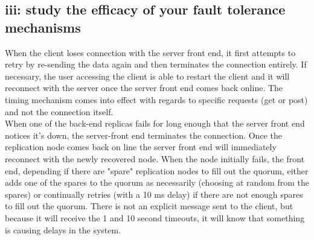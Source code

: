 \documentclass[12pt,letter]{article}
\begin{document}
\subsection*{iii: study the efficacy of your fault tolerance mechanisms}
When the client loses connection with the server front end, it first attempts to retry by re-sending the data again and then terminates the connection entirely. If necessary, the user accessing the client is able to restart the client and it will reconnect with the server once the server front end comes back online. The timing mechanism comes into effect with regards to specific requests (get or post) and not the connection itself.\\

\onehalfspacing
When one of the back-end replicas fails for long enough that the server front end notices it's down, the server-front end terminates the connection. Once the replication node comes back on line the server front end will immediately reconnect with the newly recovered node. When the node initially fails, the front end, depending if there are "spare" replication nodes to fill out the quorum, either adds one of the spares to the quorum as necessarily (choosing at random from the spares) or continually retries (with a 10 ms delay) if there are not enough spares to fill out the quorum. There is not an explicit message sent to the client, but because it will receive the 1 and 10 second timeouts, it will know that something is causing delays in the system.
\end{document}
